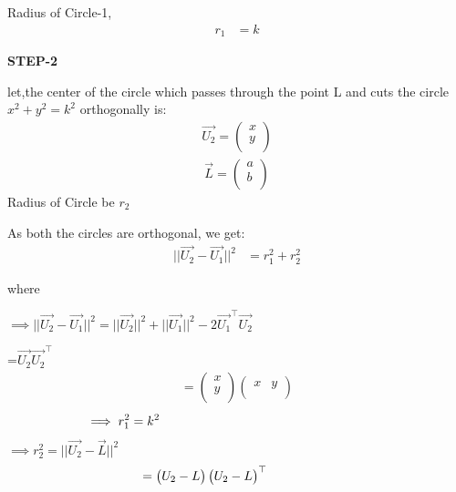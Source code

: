 \documentclass[journal,12pt,twocolumn]{IEEEtran}
\begin{document}
Radius of Circle-1,
\boldmath
\begin{align}
 r_1  &= k
\end{align}
\unboldmath


\textbf{STEP-2}

let,the center of the  circle which passes through the point  L and cuts the circle {$x^2+y^2=k^2$} orthogonally is:
\boldmath 
\begin{align} 
\vec{U_2} = \begin{pmatrix}x \\ y \\ \end{pmatrix}
\end{align} 
\begin{align} 
\vec{L} = \begin{pmatrix}a \\ b \\ \end{pmatrix} 
\end{align}
\unboldmath
Radius of Circle be $r_2$

As both the circles are orthogonal, we get:\vspace{1mm}
\boldmath
\begin{align}
  ||{\vec{U_2} - \vec{U_1}}||^2 &= r_1^2 + r_2^2
\end{align}

where

$\implies||{\vec{U_2}-\vec{U_1}}||^2=||{\vec{U_2}}||^2 + ||{\vec{U_1}}||^2 - 2\vec{U_1}^{\top}\vec{U_2}$

\vspace{0.25cm}
\hspace{3.25cm}=$\vec{U_2}\vec{U_2}^{\top}$
\begin{align}
=\begin{pmatrix}x \\ y \\ \end{pmatrix} \begin{pmatrix}x & y \\ \end{pmatrix} 
\end{align}
\begin{align}
\hspace{-3.25cm}\implies r_1^2=k^2\hspace{3cm}
\end{align}
$\implies r_2^2=||{\vec{U_2}-\vec{L}}||^2$
\begin{align}
\hspace{-1.75cm}=\begin{pmatrix}U_2-L \\ \end{pmatrix} \begin{pmatrix}U_2-L \\ \end{pmatrix}^{\top}
\end{align}
\end{document}
